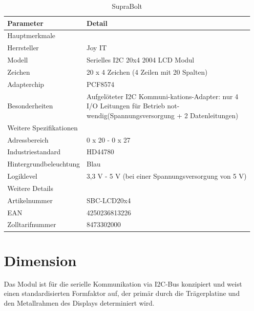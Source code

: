 \begin{table}[h!]
	\caption{SupraBolt} %
	\begin{center}
		\begin{tabular}{|l|l|}
			\hline
			\textbf{Parameter} &\textbf{Detail} \\
			\hline
			Hauptmerkmale &  	\\
			\hline
			Herrsteller & Joy IT 	\\
			\hline
			Modell & Serielles I2C 20x4 2004 LCD Modul 	\\
			\hline
			Zeichen & 20 x 4 Zeichen (4 Zeilen mit 20 Spalten)	\\
			\hline
			Adapterchip &  PCF8574	\\	
			\hline
			Besonderheiten  & Aufgelöteter I2C Kommuni-kations-Adapter: nur 4 I/O Leitungen für Betrieb not-wendig(Spannungsversorgung + 2 Datenleitungen) 	\\	
			\hline
			Weitere Spezifikationen &   	\\	
			\hline
			Adressbereich &   0 x 20 - 0 x 27	\\	
			\hline
			Industriestandard & HD44780	\\	
			\hline
			Hintergrundbeleuchtung  & Blau \\	
			\hline
			Logiklevel & 3,3 V - 5 V (bei einer Spannungsversorgung von 5 V) \\	
			\hline
			Weitere Details &   \\	
			\hline
			Artikelnummer & SBC-LCD20x4 \\	
			\hline
			EAN & 4250236813226 \\
			\hline
			Zolltarifnummer & 8473302000 	\\	
			\hline
			
		\end{tabular}
		\label{JoyIt}
	\end{center}
\end{table} 


\section{Dimension}

Das Modul ist für die serielle Kommunikation via I2C-Bus konzipiert und weist einen standardisierten Formfaktor auf, der primär durch die Trägerplatine und den Metallrahmen des Displays determiniert wird.

